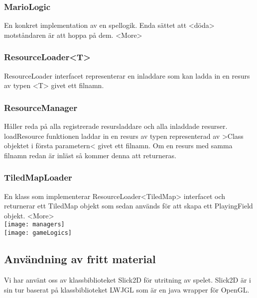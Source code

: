 \subsubsection{MarioLogic}
En konkret implementation av en spellogik. Enda sättet att <döda> motståndaren är att hoppa på dem. <More>\\
\subsubsection{ResourceLoader<T>}
ResourceLoader interfacet representerar en inladdare som kan ladda in en resurs av typen <T> givet ett filnamn.\\
\subsubsection{ResourceManager}
Håller reda på alla registrerade resursladdare och alla inladdade resurser.\\
loadResource funktionen laddar in en resurs av typen representerad av >Class objektet i första parametern< givet ett filnamn. Om en resurs med samma filnamn redan är inläst så kommer denna att returneras.\\
\subsubsection{TiledMapLoader}
En klass som implementerar ResourceLoader<TiledMap> interfacet och returnerar ett TiledMap objekt som sedan används för att skapa ett PlayingField objekt. <More>\\
\texttt{[image: managers]}\\
\texttt{[image: gameLogics]}\\
\subsection{Användning av fritt material}
Vi har använt oss av klassbiblioteket Slick2D för utritning av spelet. Slick2D är i sin tur baserat på klassbiblioteket LWJGL som är en java wrapper för OpenGL.

